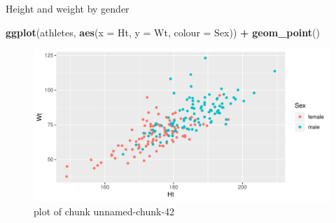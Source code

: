\documentclass[ignorenonframetext,]{beamer}
\newenvironment{Shaded}{\begin{snugshade}}{\end{snugshade}}
\newcommand{\DataTypeTok}[1]{\textcolor[rgb]{0.13,0.29,0.53}{#1}}
\newcommand{\KeywordTok}[1]{\textcolor[rgb]{0.13,0.29,0.53}{\textbf{#1}}}
\newcommand{\NormalTok}[1]{#1}
\newcommand{\OperatorTok}[1]{\textcolor[rgb]{0.81,0.36,0.00}{\textbf{#1}}}
\newcommand{\StringTok}[1]{\textcolor[rgb]{0.31,0.60,0.02}{#1}}
\begin{document}
\begin{frame}[fragile]{Height and weight by gender}
\protect\hypertarget{height-and-weight-by-gender}{}

\begin{Shaded}
\begin{Highlighting}[]
\KeywordTok{ggplot}\NormalTok{(athletes, }\KeywordTok{aes}\NormalTok{(}\DataTypeTok{x =}\NormalTok{ Ht, }\DataTypeTok{y =}\NormalTok{ Wt, }\DataTypeTok{colour =}\NormalTok{ Sex)) }\OperatorTok{+}
\StringTok{  }\KeywordTok{geom_point}\NormalTok{()}
\end{Highlighting}
\end{Shaded}

\begin{figure}
\centering
\includegraphics{figure/unnamed-chunk-42-1.pdf}
\caption{plot of chunk unnamed-chunk-42}
\end{figure}

\end{frame}
\end{document}

